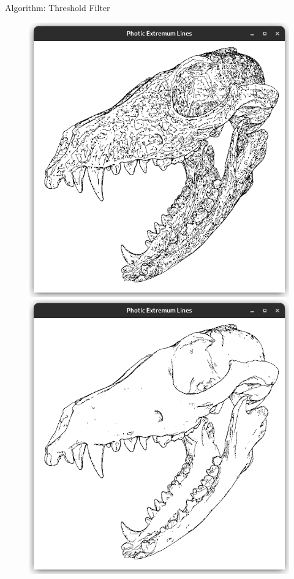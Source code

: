 \documentclass[aspectratio=169]{beamer}
\begin{document}
  \begin{frame}{Algorithm: Threshold Filter}
    \begin{figure}
      \center
      \includegraphics[height=0.49\textheight,trim={15px 15 15 50},clip]{images/fox-skull-threshold-low.png}
      \hspace{5em}
      \includegraphics[height=0.49\textheight,trim={15px 15 15 50},clip]{images/fox-skull-threshold-mid.png}

\end{figure}
\end{frame}
\end{document}
